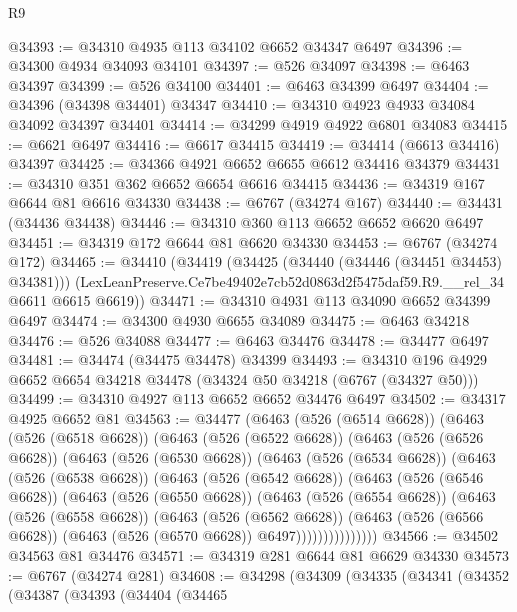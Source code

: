 \begin{lexlean}{R9}
\begin{coremodule}
@34393 := @34310 @4935 @113 @34102 @6652 @34347 @6497
@34396 := @34300 @4934 @34093 @34101
@34397 := @526 @34097
@34398 := @6463 @34397
@34399 := @526 @34100
@34401 := @6463 @34399 @6497
@34404 := @34396 (@34398 @34401) @34347
@34410 := @34310 @4923 @4933 @34084 @34092 @34397 @34401
@34414 := @34299 @4919 @4922 @6801 @34083
@34415 := @6621 @6497
@34416 := @6617 @34415
@34419 := @34414 (@6613 @34416) @34397
@34425 := @34366 @4921 @6652 @6655 @6612 @34416 @34379
@34431 := @34310 @351 @362 @6652 @6654 @6616 @34415
@34436 := @34319 @167 @6644 @81 @6616 @34330
@34438 := @6767 (@34274 @167)
@34440 := @34431 (@34436 @34438)
@34446 := @34310 @360 @113 @6652 @6652 @6620 @6497
@34451 := @34319 @172 @6644 @81 @6620 @34330
@34453 := @6767 (@34274 @172)
@34465 := @34410
    (@34419
      (@34425 (@34440 (@34446 (@34451 @34453) @34381)))
      (LexLeanPreserve.Ce7be49402e7cb52d0863d2f5475daf59.R9.__rel_34 @6611 @6615 @6619))
@34471 := @34310 @4931 @113 @34090 @6652 @34399 @6497
@34474 := @34300 @4930 @6655 @34089
@34475 := @6463 @34218
@34476 := @526 @34088
@34477 := @6463 @34476
@34478 := @34477 @6497
@34481 := @34474 (@34475 @34478) @34399
@34493 := @34310 @196 @4929 @6652 @6654 @34218 @34478 (@34324 @50 @34218 (@6767 (@34327 @50)))
@34499 := @34310 @4927 @113 @6652 @6652 @34476 @6497
@34502 := @34317 @4925 @6652 @81
@34563 := @34477
    (@6463
      (@526 (@6514 @6628))
      (@6463
        (@526 (@6518 @6628))
        (@6463
          (@526 (@6522 @6628))
          (@6463
            (@526 (@6526 @6628))
            (@6463
              (@526 (@6530 @6628))
              (@6463
                (@526 (@6534 @6628))
                (@6463
                  (@526 (@6538 @6628))
                  (@6463
                    (@526 (@6542 @6628))
                    (@6463
                      (@526 (@6546 @6628))
                      (@6463
                        (@526 (@6550 @6628))
                        (@6463
                          (@526 (@6554 @6628))
                          (@6463
                            (@526 (@6558 @6628))
                            (@6463
                              (@526 (@6562 @6628))
                              (@6463
                                (@526 (@6566 @6628))
                                (@6463 (@526 (@6570 @6628)) @6497)))))))))))))))
@34566 := @34502 @34563 @81 @34476
@34571 := @34319 @281 @6644 @81 @6629 @34330
@34573 := @6767 (@34274 @281)
@34608 := @34298
    (@34309
      (@34335
        (@34341
          (@34352
            (@34387
              (@34393
                (@34404
                  (@34465

\end{coremodule}
\end{lexlean}
